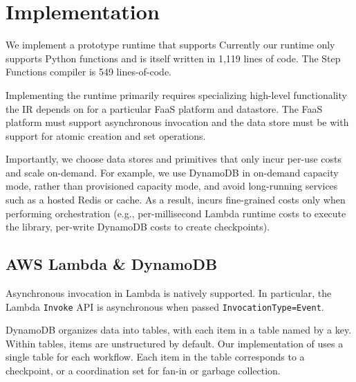 \section{Implementation}\label{sec:impl}

We implement a prototype \name{} runtime that supports  Currently our runtime only supports
Python functions and is itself written in 1,119 lines of code. The Step
Functions compiler is 549 lines-of-code.

Implementing the runtime primarily requires specializing high-level
functionality the IR depends on for a particular FaaS platform and datastore.
The FaaS platform must support asynchronous invocation and the data store
must be  with support for atomic creation
and set operations.

Importantly, we choose data stores and primitives that only incur per-use
costs and scale on-demand. For example, we use DynamoDB in on-demand capacity
mode, rather than provisioned capacity mode, and avoid long-running services
such as a hosted Redis or cache. As a result, \name{} incurs \secondedits
{fine-grained costs only when performing orchestration (e.g., per-millisecond
Lambda runtime costs to execute the \name{} library, per-write DynamoDB costs
to create checkpoints)}.

\subsection{AWS Lambda \& DynamoDB}

Asynchronous invocation in Lambda is natively supported. In particular, the
Lambda \texttt{Invoke} API is asynchronous when passed
\texttt{InvocationType=Event}. 

DynamoDB organizes data into tables, with each item in a table named by a key.
Within tables, items are unstructured by default. Our implementation of
\name{} uses a single table for each workflow. Each item in the table
corresponds to a checkpoint, or a coordination set for fan-in or garbage
collection.

